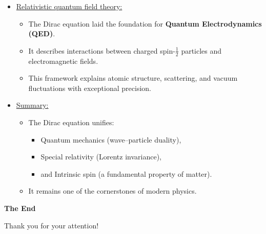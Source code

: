 \documentclass[t,aspectratio=169]{beamer}
\begin{document}
\begin{frame}
\begin{itemize}
\pagebreak

\item \underline{Relativistic quantum field theory:}
\begin{itemize}
\item The Dirac equation laid the foundation for \textbf{Quantum Electrodynamics (QED)}.
\item It describes interactions between charged spin-$\tfrac{1}{2}$ particles and electromagnetic fields.
\item This framework explains atomic structure, scattering, and vacuum fluctuations with exceptional precision.
\end{itemize}

\item \underline{Summary:}
\begin{itemize}
\item The Dirac equation unifies:
  \begin{itemize}
    \item Quantum mechanics (wave–particle duality),
    \item Special relativity (Lorentz invariance),
    \item and Intrinsic spin (a fundamental property of matter).
  \end{itemize}
\item It remains one of the cornerstones of modern physics.
\end{itemize}

\end{itemize}
\end{frame}



\begin{frame}

\vfill
\begin{center}
\textbf{\huge The End}

\bigskip
Thank you for your attention!
\end{center}
\vfill
\end{frame}
\end{document}
